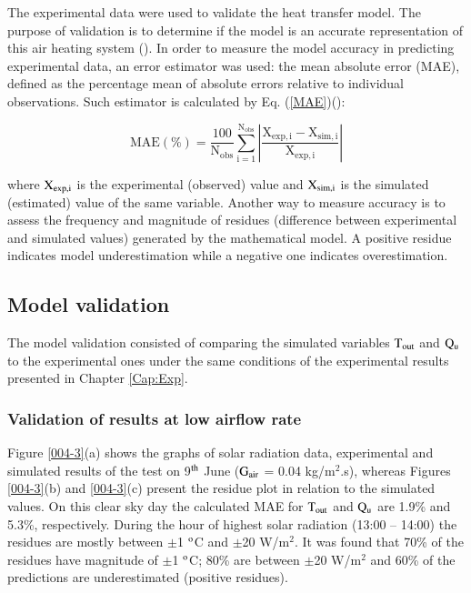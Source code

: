 The experimental data were used to validate the heat transfer model. The purpose of validation is to determine if the model is an accurate representation of this air heating system (\cite{Banks1987}). In order to measure the model accuracy in predicting experimental data, an error estimator was used: the mean absolute error (MAE), defined as the percentage mean of absolute errors relative to individual observations. Such estimator is calculated by Eq. (\ref{MAE})(\cite{Pujol-Nadal2015}):

\vspace{-0.75cm}
\begin{equation}
\mathrm{MAE(\% ) = \frac{{100}}{{{N_{obs}}}}\sum\limits_{i = 1}^{{N_{obs}}} {\left| {\frac{{{X_{exp,i}} - {X_{sim,i}}}}{{{X_{exp,i}}}}} \right|} }
\label{MAE}
\end{equation}

\noindent where $\rm{X_{exp,i}}$ is the experimental (observed) value and $\rm{X_{sim,i}}$ is the simulated (estimated) value of the same variable. Another way to measure accuracy is to assess the frequency and magnitude of residues (difference between experimental and simulated values) generated by the mathematical model. A positive residue indicates model underestimation while a negative one indicates overestimation.

\subsection{Model validation}

The model validation consisted of comparing the simulated variables $\rm{T_{out}}$ and $\rm{Q_{u}}$ to the experimental ones under the same conditions of the experimental results presented in Chapter \ref{Cap:Exp}.

\subsubsection{Validation of results at low airflow rate}

Figure \ref{004-3}(a) shows the graphs of solar radiation data, experimental and simulated results of the test on 9$^{\rm{th}}$ June ($\rm{G_{air}}$ = 0.04 kg/m$^2$.s), whereas Figures \ref{004-3}(b) and \ref{004-3}(c) present the residue plot in relation to the simulated values. On this clear sky day the calculated MAE for $\rm{T_{out}}$ and $\rm{Q_{u}}$ are 1.9\% and 5.3\%, respectively. During the hour of highest solar radiation (13:00 -- 14:00) the residues are mostly between $\pm$1 $^{\rm{o}}$C and $\pm$20 W/m$^2$. It was found that 70\% of the residues have magnitude of $\pm$1 $^{\rm{o}}$C;  80\% are between $\pm$20 W/m$^2$ and 60\% of the predictions are underestimated (positive residues).

